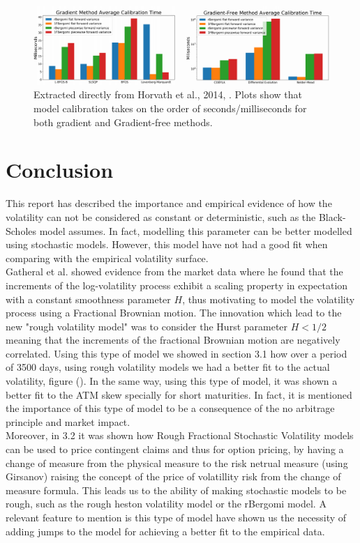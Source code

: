 \documentclass[12pt,oneside]{article}
\begin{document}
 \begin{figure}[htpb]
    \centering
    \includegraphics[width=1.0\textwidth ]{figs/Horvath2019_fig10_11}
    \caption{Extracted directly from Horvath et al., 2014, \cite[Figures~10\&11]{Horvath2019}. Plots show that model calibration takes on the order of seconds/milliseconds for both gradient and Gradient-free methods.}
    \label{fig:Horvath2019_fig10_11} 
\end{figure}

\section{Conclusion}
\label{sec:summary&futurework}
 
This report has described the importance and empirical evidence of how the volatility can not be considered as constant or deterministic, such as the Black-Scholes model assumes. In fact, modelling this parameter can be better modelled using stochastic models. However, this model have not had a good fit when comparing with the empirical volatility surface. 
\\

Gatheral et al. showed evidence from the market data where he found that the increments of the log-volatility process exhibit a scaling property in expectation with a constant smoothness parameter $H$, thus motivating to model the volatility process using a Fractional Brownian motion. The innovation which lead to the new "rough volatility model" was to consider the Hurst parameter $H < 1/2$ meaning that the increments of the fractional Brownian motion are negatively correlated. Using this type of model we showed in section 3.1 how over a period of 3500 days, using rough volatility models we had a better fit to the actual volatility, figure (). In the same way, using this type of model, it was shown a better fit to the ATM skew specially for short maturities.  In fact, it is mentioned the importance of this type of model to be a consequence of the no arbitrage principle and market impact.
\\

Moreover, in 3.2 it was shown how Rough Fractional Stochastic Volatility models can  be  used  to  price  contingent  claims  and  thus  for  option  pricing, by having a change of measure from the physical measure to the risk netrual measure (using Girsanov) raising the concept of the price of volatillity risk from the change of measure formula. This leads us to the ability of making stochastic models to be rough, such as the rough heston volatility model or the rBergomi model. A relevant feature to mention is this type of model have shown us the necessity of adding jumps to the model for achieving a better fit to the empirical data.
\\
\end{document}
